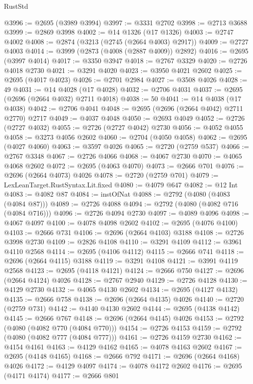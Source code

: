 \begin{lexlean}{RustStd}
\begin{coremodule}
@3996 := @2695 (@3989 @3994)
@3997 := @3331 @2702
@3998 := @2713 @3688
@3999 := @2869 @3998
@4002 := @14 @1326 (@17 @1326)
@4003 := @2747 @4002
@4008 := @2874 (@3213 (@2745 (@2664 @4003) @2917))
@4009 := @2727 @4003
@4014 := @3999 (@2873 (@4008 (@2887 @4009)) @2892)
@4016 := @2695 (@3997 @4014)
@4017 := @3350 @3947
@4018 := @2767 @3329
@4020 := @2726 @4018 @2730
@4021 := @3291 @4020
@4023 := @3950 @4021 @2602
@4025 := @2695 (@4017 @4023)
@4026 := @2701 @2984
@4027 := @3508 @4026
@4028 := 49
@4031 := @14 @4028 (@17 @4028)
@4032 := @2706 @4031
@4037 := @2695 (@2696 (@2664 @4032) @2711 @4018)
@4038 := 50
@4041 := @14 @4038 (@17 @4038)
@4042 := @2706 @4041
@4048 := @2695 (@2696 (@2664 @4042) @2711 @2770) @2717
@4049 := @4037 @4048
@4050 := @2693 @4049
@4052 := @2726 (@2727 @4032)
@4055 := @2726 (@2727 @4042) @2730
@4056 := @4052 @4055
@4058 := @3273 @4056 @2602
@4060 := @2704 (@4050 @4058)
@4062 := @2695 (@4027 @4060)
@4063 := @3597 @4026
@4065 := @2720 (@2759 @537)
@4066 := @2767 @3348
@4067 := @2726 @4066
@4068 := @4067 @2730
@4070 := @4065 @4068 @2602
@4072 := @2695 (@4063 @4070)
@4073 := @2666 @701
@4076 := @2696 (@2664 @4073) @4026
@4078 := @2720 (@2759 @701)
@4079 := LexLeanTarget.RustSyntax.Lit.fixed
@4080 := @4079 @647
@4082 := @12 Int
@4083 := @4082 @87
@4084 := instOfNat
@4088 := @2792 (@4080 (@4083 (@4084 @87)))
@4089 := @2726 @4088
@4094 := @2792 (@4080 (@4082 @716 (@4084 @716)))
@4096 := @2726 @4094 @2730
@4097 := @4089 @4096
@4098 := @4067 @4097
@4100 := @4078 @4098 @2602
@4102 := @2695 (@4076 @4100)
@4103 := @2666 @731
@4106 := @2696 (@2664 @4103) @3188
@4108 := @2726 @3998 @2730
@4109 := @2826 @4108
@4110 := @3291 @4109
@4112 := @3961 @4110 @2568
@4114 := @2695 (@4106 @4112)
@4115 := @2666 @741
@4118 := @2696 (@2664 @4115) @3188
@4119 := @3291 @4108
@4121 := @3991 @4119 @2568
@4123 := @2695 (@4118 @4121)
@4124 := @2666 @750
@4127 := @2696 (@2664 @4124) @4026
@4128 := @2767 @2940
@4129 := @2726 @4128
@4130 := @4129 @2730
@4132 := @4065 @4130 @2602
@4134 := @2695 (@4127 @4132)
@4135 := @2666 @758
@4138 := @2696 (@2664 @4135) @4026
@4140 := @2720 (@2759 @731)
@4142 := @4140 @4130 @2602
@4144 := @2695 (@4138 @4142)
@4145 := @2666 @767
@4148 := @2696 (@2664 @4145) @4026
@4153 := @2792 (@4080 (@4082 @770 (@4084 @770)))
@4154 := @2726 @4153
@4159 := @2792 (@4080 (@4082 @777 (@4084 @777)))
@4161 := @2726 @4159 @2730
@4162 := @4154 @4161
@4163 := @4129 @4162
@4165 := @4078 @4163 @2602
@4167 := @2695 (@4148 @4165)
@4168 := @2666 @792
@4171 := @2696 (@2664 @4168) @4026
@4172 := @4129 @4097
@4174 := @4078 @4172 @2602
@4176 := @2695 (@4171 @4174)
@4177 := @2666 @801

\end{coremodule}
\end{lexlean}

